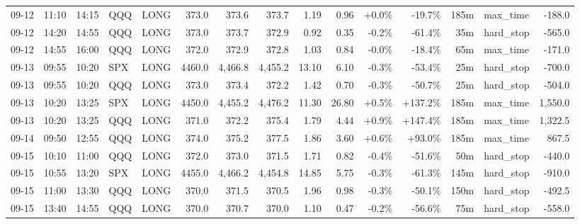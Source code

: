 \documentclass[11pt,a4paper,twoside]{article}
\begin{document}
\begin{landscape}
\begin{center}
\begin{longtable}{>{\color{txtmain}}l l l l l r r r r r r r r >{\color{txtmain}}l r}
09-12 & 11:10 & 14:15 & QQQ & LONG & 373.0 & 373.6 & 373.7 & 1.19 & 0.96 & \textcolor{wingreen}{+0.0\%} & \textcolor{lossred}{-19.7\%} & 185m & max\_time & \textcolor{lossred}{-188.0} \\
09-12 & 14:20 & 14:55 & QQQ & LONG & 373.0 & 373.7 & 372.9 & 0.92 & 0.35 & \textcolor{lossred}{-0.2\%} & \textcolor{lossred}{-61.4\%} & 35m & hard\_stop & \textcolor{lossred}{-565.0} \\
09-12 & 14:55 & 16:00 & QQQ & LONG & 372.0 & 372.9 & 372.8 & 1.03 & 0.84 & \textcolor{lossred}{-0.0\%} & \textcolor{lossred}{-18.4\%} & 65m & max\_time & \textcolor{lossred}{-171.0} \\
09-13 & 09:55 & 10:20 & SPX & LONG & 4460.0 & 4,466.8 & 4,455.2 & 13.10 & 6.10 & \textcolor{lossred}{-0.3\%} & \textcolor{lossred}{-53.4\%} & 25m & hard\_stop & \textcolor{lossred}{-700.0} \\
09-13 & 09:55 & 10:20 & QQQ & LONG & 373.0 & 373.4 & 372.2 & 1.42 & 0.70 & \textcolor{lossred}{-0.3\%} & \textcolor{lossred}{-50.7\%} & 25m & hard\_stop & \textcolor{lossred}{-504.0} \\
09-13 & 10:20 & 13:25 & SPX & LONG & 4450.0 & 4,455.2 & 4,476.2 & 11.30 & 26.80 & \textcolor{wingreen}{+0.5\%} & \textcolor{wingreen}{+137.2\%} & 185m & max\_time & \textcolor{wingreen}{1,550.0} \\
09-13 & 10:20 & 13:25 & QQQ & LONG & 371.0 & 372.2 & 375.4 & 1.79 & 4.44 & \textcolor{wingreen}{+0.9\%} & \textcolor{wingreen}{+147.4\%} & 185m & max\_time & \textcolor{wingreen}{1,322.5} \\
09-14 & 09:50 & 12:55 & QQQ & LONG & 374.0 & 375.2 & 377.5 & 1.86 & 3.60 & \textcolor{wingreen}{+0.6\%} & \textcolor{wingreen}{+93.0\%} & 185m & max\_time & \textcolor{wingreen}{867.5} \\
09-15 & 10:10 & 11:00 & QQQ & LONG & 372.0 & 373.0 & 371.5 & 1.71 & 0.82 & \textcolor{lossred}{-0.4\%} & \textcolor{lossred}{-51.6\%} & 50m & hard\_stop & \textcolor{lossred}{-440.0} \\
09-15 & 10:55 & 13:20 & SPX & LONG & 4455.0 & 4,466.2 & 4,454.8 & 14.85 & 5.75 & \textcolor{lossred}{-0.3\%} & \textcolor{lossred}{-61.3\%} & 145m & hard\_stop & \textcolor{lossred}{-910.0} \\
09-15 & 11:00 & 13:30 & QQQ & LONG & 370.0 & 371.5 & 370.5 & 1.96 & 0.98 & \textcolor{lossred}{-0.3\%} & \textcolor{lossred}{-50.1\%} & 150m & hard\_stop & \textcolor{lossred}{-492.5} \\
09-15 & 13:40 & 14:55 & QQQ & LONG & 370.0 & 370.7 & 370.0 & 1.10 & 0.47 & \textcolor{lossred}{-0.2\%} & \textcolor{lossred}{-56.6\%} & 75m & hard\_stop & \textcolor{lossred}{-558.0} \\

\end{longtable}
\end{center}
\end{landscape}
\end{document}
